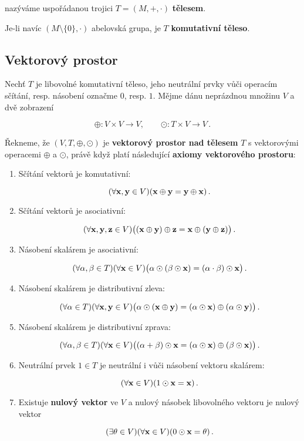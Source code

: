 nazýváme uspořádanou trojici $T = (M, +, \cdot)$ \textbf{tělesem}.

Je-li navíc $(M\setminus \{0\}, \cdot)$ abelovská grupa, je $T$
\textbf{komutativní těleso}.

\subsection*{Vektorový prostor}

Nechť $T$ je libovolné komutativní těleso, jeho neutrální prvky vůči operacím
sčítání, resp. násobení označme $0$, resp. $1$. Mějme dánu neprázdnou množinu
$V$ a dvě zobrazení

\[ \oplus: V\times V\to V,\qquad \odot:T\times V\to V\,. \]

Řekneme, že $(V,T,\oplus,\odot)$ je \textbf{vektorový prostor nad tělesem} $T$ s vektorovými operacemi $\oplus$ a $\odot$, právě když platí následující \textbf{axiomy vektorového prostoru}:

\begin{enumerate}
    \item Sčítání vektorů je komutativní:

          \[ (\forall \mathbf{x},\mathbf{y}\in V)(\mathbf{x}\oplus \mathbf{y}=\mathbf{y}\oplus\mathbf{x})\,. \]

    \item Sčítání vektorů je asociativní:

          \[ (\forall \mathbf{x},\mathbf{y},\mathbf{z}\in V)\big((\mathbf{x}\oplus \mathbf{y})\oplus \mathbf{z}=\mathbf{x}\oplus(\mathbf{y}\oplus \mathbf{z})\big)\,. \]

    \item Násobení skalárem je asociativní:

          \[ (\forall\alpha,\beta\in T)(\forall \mathbf{x}\in V) \big(\alpha\odot(\beta\odot \mathbf{x})=(\alpha\cdot\beta)\odot \mathbf{x} \big)\,. \]

    \item Násobení skalárem je distributivní zleva:

          \[ (\forall\alpha\in T) (\forall \mathbf{x},\mathbf{y}\in V) \big(\alpha\odot(\mathbf{x}\oplus \mathbf{y})=(\alpha\odot \mathbf{x})\oplus(\alpha\odot \mathbf{y})\big)\,. \]

    \item Násobení skalárem je distributivní zprava:

          \[ (\forall\alpha,\beta\in T)(\forall \mathbf{x}\in V) \big((\alpha+\beta)\odot \mathbf{x}=(\alpha\odot \mathbf{x})\oplus(\beta\odot \mathbf{x})\big)\,. \]

    \item Neutrální prvek $1\in T$ je neutrální i vůči násobení vektoru skalárem:

          \[ (\forall \mathbf{x}\in V) (1\odot \mathbf{x}=\mathbf{x})\,. \]

    \item Existuje \textbf{nulový vektor} ve $V$ a nulový násobek libovolného vektoru je
          nulový vektor

          \[ (\exists\theta\in V) (\forall \mathbf{x}\in V) (0\odot \mathbf{x}=\theta)\,.\]

\end{enumerate}

